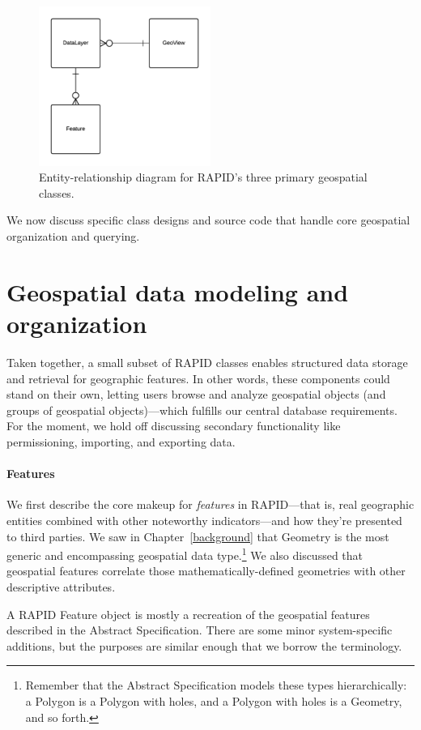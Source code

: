 \begin{figure}[h]
    \centering
    \includegraphics[width=0.5\textwidth]{figures/3er.png}
    \caption{Entity-relationship diagram for RAPID's three primary geospatial classes.}
    \label{fig:3er}
\end{figure}

We now discuss specific class designs and source code that handle core geospatial organization and querying.

\section{Geospatial data modeling and organization}
Taken together, a small subset of RAPID classes enables structured data storage and retrieval for geographic features. In other words, these components could stand on their own, letting users browse and analyze geospatial objects (and groups of geospatial objects)---which fulfills our central database requirements. For the moment, we hold off discussing secondary functionality like permissioning, importing, and exporting data.

\paragraph{Features}
We first describe the core makeup for \textit{features} in RAPID---that is, real geographic entities combined with other noteworthy indicators---and how they're presented to third parties. We saw in Chapter~\ref{background} that Geometry is the most generic and encompassing geospatial data type.\footnote{Remember that the Abstract Specification models these types hierarchically: a Polygon is a Polygon with holes, and a Polygon with holes is a Geometry, and so forth.} We also discussed that geospatial features correlate those mathematically-defined geometries with other descriptive attributes.

A RAPID Feature object is mostly a recreation of the geospatial features described in the Abstract Specification. There are some minor system-specific additions, but the purposes are similar enough that we borrow the terminology.

